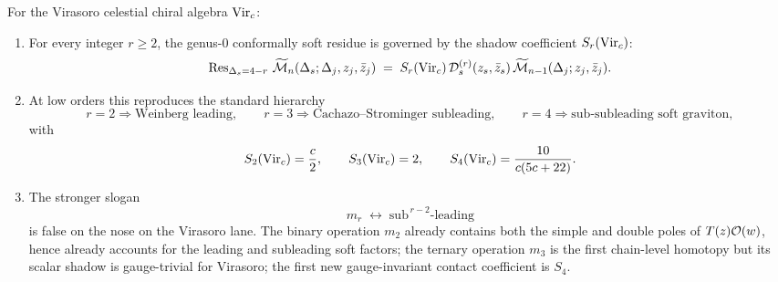 \begin{theorem}
\label{thm:gravity-three-soft}
For the Virasoro celestial chiral algebra $\mathrm{Vir}_c$:
\begin{enumerate}[label=\textup{(\roman*)}]
\item For every integer $r \ge 2$, the genus-$0$ conformally soft
residue is governed by the shadow coefficient $S_r(\mathrm{Vir}_c)$:
\begin{equation}\label{eq:gravity-three-soft-residue}
\operatorname{Res}_{\Delta_s = 4-r}\,
\widetilde{\mathcal M}_n(\Delta_s; \Delta_j, z_j, \bar z_j)
\;=\;
S_r(\mathrm{Vir}_c)\,\mathcal D_s^{(r)}(z_s,\bar z_s)\,
\widetilde{\mathcal M}_{n-1}(\Delta_j; z_j, \bar z_j).
\end{equation}
\item At low orders this reproduces the standard hierarchy
\[
r=2 \Longrightarrow \text{Weinberg leading},\qquad
r=3 \Longrightarrow \text{Cachazo--Strominger subleading},\qquad
r=4 \Longrightarrow \text{sub-subleading soft graviton},
\]
with
\[
S_2(\mathrm{Vir}_c)=\frac{c}{2},\qquad
S_3(\mathrm{Vir}_c)=2,\qquad
S_4(\mathrm{Vir}_c)=\frac{10}{c(5c+22)}.
\]
\item The stronger slogan
\[
m_r \;\leftrightarrow\; \mathrm{sub}^{\,r-2}\text{-leading}
\]
is false on the nose on the Virasoro lane. The binary operation
$m_2$ already contains both the simple and double poles of
$T(z)\mathcal O(w)$, hence already accounts for the leading and subleading
soft factors; the ternary operation $m_3$ is the first chain-level
homotopy but its scalar shadow is gauge-trivial for Virasoro; the
first new gauge-invariant contact coefficient is $S_4$.
\end{enumerate}
\end{theorem}


